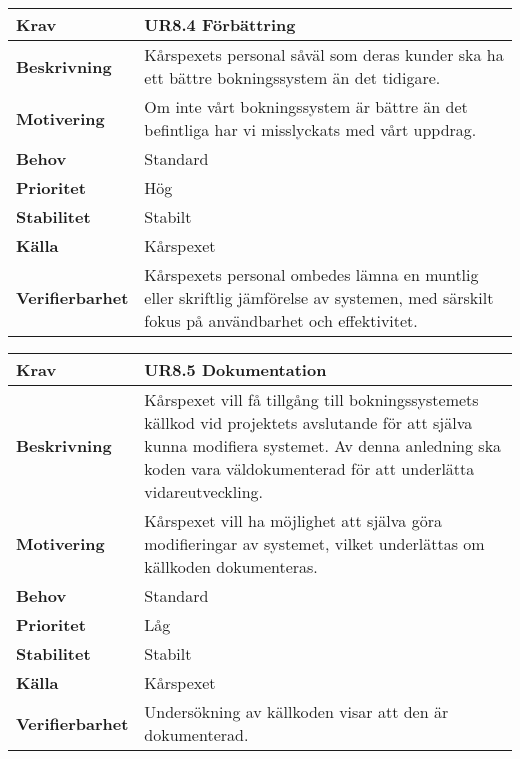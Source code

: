 \documentclass[a4paper, twoside, 11pt, titlepage]{article}
\begin{document}
		\begin{tabular} { p{2.6cm} p{12.5cm} }
			\hline
			\sffamily\textbf{Krav} & \sffamily\textbf{UR8.4 Förbättring } \\
			\hline
			\sffamily\textbf{Beskrivning} & Kårspexets personal såväl som deras kunder ska ha ett bättre bokningssystem än det tidigare.  \\
			\hline
			\sffamily\textbf{Motivering} & Om inte vårt bokningssystem är bättre än det befintliga har vi misslyckats med vårt uppdrag.  \\
			\hline
			\sffamily\textbf{Behov} & Standard  \\
			\hline
			\sffamily\textbf{Prioritet} & Hög  \\
			\hline
			\sffamily\textbf{Stabilitet} & Stabilt  \\
			\hline
			\sffamily\textbf{Källa} & Kårspexet  \\
			\hline
			\sffamily\textbf{Verifierbarhet} & Kårspexets personal ombedes lämna en muntlig eller skriftlig jämförelse av systemen, med särskilt fokus på användbarhet och effektivitet.  \\
			\hline
		\end{tabular}
		\vspace{6mm}

		\begin{tabular} { p{2.6cm} p{12.5cm} }
			\hline
			\sffamily\textbf{Krav} & \sffamily\textbf{UR8.5 Dokumentation } \\
			\hline
			\sffamily\textbf{Beskrivning} & Kårspexet vill få tillgång till bokningssystemets källkod vid projektets avslutande för att själva kunna modifiera systemet. Av denna anledning ska koden vara väldokumenterad för att underlätta vidareutveckling.  \\
			\hline
			\sffamily\textbf{Motivering} & Kårspexet vill ha möjlighet att själva göra modifieringar av systemet, vilket underlättas om källkoden dokumenteras.  \\
			\hline
			\sffamily\textbf{Behov} & Standard  \\
			\hline
			\sffamily\textbf{Prioritet} & Låg  \\
			\hline
			\sffamily\textbf{Stabilitet} & Stabilt  \\
			\hline
			\sffamily\textbf{Källa} & Kårspexet  \\
			\hline
			\sffamily\textbf{Verifierbarhet} & Undersökning av källkoden visar att den är dokumenterad.  \\
			\hline
		\end{tabular}
		\vspace{6mm}
\end{document}
